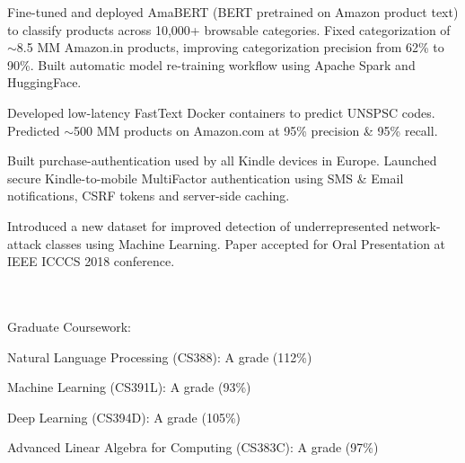 \documentclass[]{deedy-resume-openfont}
\begin{document}
\begin{tightemize}
    \item Fine-tuned and deployed AmaBERT (BERT pretrained on Amazon product text) to classify products across 10,000+ browsable categories. Fixed categorization of $\sim$8.5 MM Amazon.in products, improving categorization precision from 62\% to 90\%. Built automatic model re-training workflow using Apache Spark and HuggingFace. 
    \item Developed low-latency FastText Docker containers to predict UNSPSC codes. Predicted $\sim$500 MM products on Amazon.com at 95\% precision \& 95\% recall.
\end{tightemize}
\sectionsep

 
\begin{tightemize}
    \item Built purchase-authentication used by all Kindle devices in Europe. Launched secure Kindle-to-mobile \mbox{MultiFactor} authentication using SMS \& Email notifications, CSRF tokens and server-side caching.
\end{tightemize}
\sectionsep

 
\begin{tightemize}
    \item Introduced a new dataset for improved detection of underrepresented network-attack classes using Machine Learning. \mbox{Paper} accepted for Oral Presentation at IEEE ICCCS 2018 conference.
\end{tightemize}


 \\
 \\
Graduate Coursework:
\begin{tightemize}
    \item Natural Language Processing (CS388): A grade (112\%)
    \item Machine Learning (CS391L): A grade (93\%)
    \item Deep Learning (CS394D): A grade (105\%)
    \item Advanced Linear Algebra for Computing (CS383C): A grade (97\%)
\end{tightemize}
\sectionsep
\end{document}
